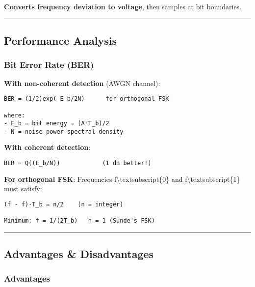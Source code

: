 \textbf{Converts frequency deviation to voltage}, then samples at bit
boundaries.

\begin{center}\rule{0.5\linewidth}{0.5pt}\end{center}

\subsection{\texorpdfstring{ Performance
Analysis}{ Performance Analysis}}\label{performance-analysis}

\subsubsection{Bit Error Rate (BER)}\label{bit-error-rate-ber}

\textbf{With non-coherent detection} (AWGN channel):

\begin{verbatim}
BER = (1/2)exp(-E_b/2N)      for orthogonal FSK

where:
- E_b = bit energy = (A²T_b)/2
- N = noise power spectral density
\end{verbatim}

\textbf{With coherent detection}:

\begin{verbatim}
BER = Q((E_b/N))            (1 dB better!)
\end{verbatim}

\textbf{For orthogonal FSK}: Frequencies
f\textbackslash textsubscript\{0\} and
f\textbackslash textsubscript\{1\} must satisfy:

\begin{verbatim}
(f - f)·T_b = n/2    (n = integer)

Minimum: f = 1/(2T_b)   h = 1 (Sunde's FSK)
\end{verbatim}

\begin{center}\rule{0.5\linewidth}{0.5pt}\end{center}

\subsection{\texorpdfstring{ Advantages \&
Disadvantages}{ Advantages \& Disadvantages}}\label{advantages-disadvantages}

\subsubsection{Advantages}\label{advantages}

